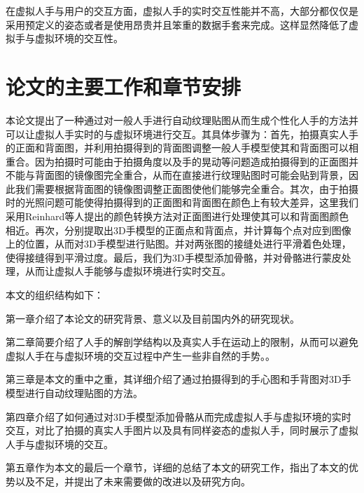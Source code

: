在虚拟人手与用户的交互方面，虚拟人手的实时交互性能并不高，大部分都仅仅是采用预定义的姿态或者是使用昂贵并且笨重的数据手套来完成。这样显然降低了虚拟手与虚拟环境的交互性。

\section{论文的主要工作和章节安排}
本论文提出了一种通过对一般人手进行自动纹理贴图从而生成个性化人手的方法并可以让虚拟人手实时的与虚拟环境进行交互。其具体步骤为：首先，拍摄真实人手的正面和背面图，并利用拍摄得到的背面图调整一般人手模型使其和背面图可以相重合。因为拍摄时可能由于拍摄角度以及手的晃动等问题造成拍摄得到的正面图并不能与背面图的镜像图完全重合，从而在直接进行纹理贴图时可能会贴到背景，因此我们需要根据背面图的镜像图调整正面图使他们能够完全重合。其次，由于拍摄时的光照问题可能使得拍摄得到的正面图和背面图在颜色上有较大差异，这里我们采用Reinhard等人\cite{Reinhard01}提出的颜色转换方法对正面图进行处理使其可以和背面图颜色相近。再次，分别提取出3D手模型的正面点和背面点，并计算每个点对应到图像上的位置，从而对3D手模型进行贴图。并对两张图的接缝处进行平滑着色处理，使得接缝得到平滑过度。最后，我们为3D手模型添加骨骼，并对骨骼进行蒙皮处理，从而让虚拟人手能够与虚拟环境进行实时交互。

本文的组织结构如下：

第一章介绍了本论文的研究背景、意义以及目前国内外的研究现状。

第二章简要介绍了人手的解剖学结构以及真实人手在运动上的限制，从而可以避免虚拟人手在与虚拟环境的交互过程中产生一些非自然的手势。。

第三章是本文的重中之重，其详细介绍了通过拍摄得到的手心图和手背图对3D手模型进行自动纹理贴图的方法。

第四章介绍了如何通过对3D手模型添加骨骼从而完成虚拟人手与虚拟环境的实时交互，对比了拍摄的真实人手图片以及具有同样姿态的虚拟人手，同时展示了虚拟人手与虚拟环境的交互。

第五章作为本文的最后一个章节，详细的总结了本文的研究工作，指出了本文的优势以及不足，并提出了未来需要做的改进以及研究方向。
